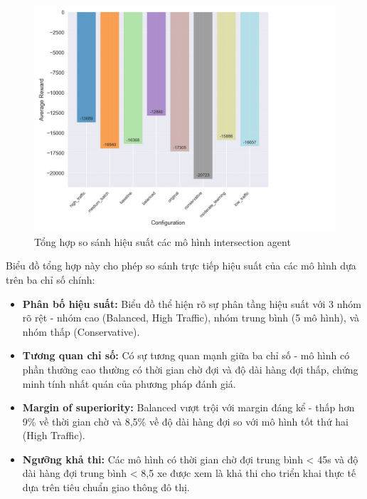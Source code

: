 \begin{figure}[!htp]
    \centering
    \includegraphics[width=\textwidth]{
        figures/individual_plots/intersection_filtered_performance_summary.png
    }
    \caption{Tổng hợp so sánh hiệu suất các mô hình intersection agent}
    \label{fig:intersection_filtered_performance_summary}
\end{figure}

Biểu đồ tổng hợp này cho phép so sánh trực tiếp hiệu suất của các mô hình dựa trên ba chỉ số chính:

\begin{itemize}
    \item \textbf{Phân bố hiệu suất:} Biểu đồ thể hiện rõ sự phân tầng hiệu suất với 3 nhóm rõ rệt - nhóm cao (Balanced, High Traffic), nhóm trung bình (5 mô hình), và nhóm thấp (Conservative).
    
    \item \textbf{Tương quan chỉ số:} Có sự tương quan mạnh giữa ba chỉ số - mô hình có phần thưởng cao thường có thời gian chờ đợi và độ dài hàng đợi thấp, chứng minh tính nhất quán của phương pháp đánh giá.
    
    \item \textbf{Margin of superiority:} Balanced vượt trội với margin đáng kể - thấp hơn 9\% về thời gian chờ và 8,5\% về độ dài hàng đợi so với mô hình tốt thứ hai (High Traffic).
    
    \item \textbf{Ngưỡng khả thi:} Các mô hình có thời gian chờ đợi trung bình < 45s và độ dài hàng đợi trung bình < 8,5 xe được xem là khả thi cho triển khai thực tế dựa trên tiêu chuẩn giao thông đô thị.
\end{itemize}

